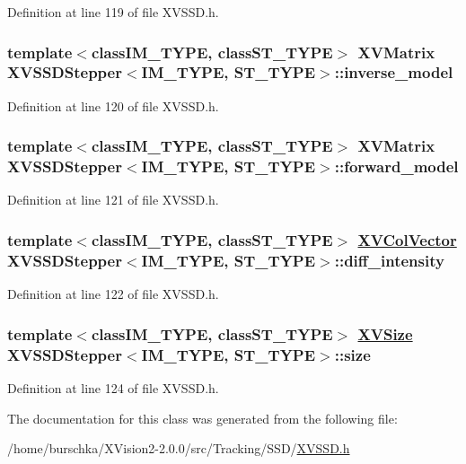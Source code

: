 Definition at line 119 of file XVSSD.h.\label{XVSSDStepper_n5}
\hypertarget{class_XVSSDStepper_n5}{
\subsubsection[inverse_model]{\setlength{\rightskip}{0pt plus 5cm}template$<$classIM\_\-TYPE, classST\_\-TYPE$>$ XVMatrix XVSSDStepper$<$IM\_\-TYPE, ST\_\-TYPE$>$::inverse\_\-model}}




Definition at line 120 of file XVSSD.h.\label{XVSSDStepper_n6}
\hypertarget{class_XVSSDStepper_n6}{
\subsubsection[forward_model]{\setlength{\rightskip}{0pt plus 5cm}template$<$classIM\_\-TYPE, classST\_\-TYPE$>$ XVMatrix XVSSDStepper$<$IM\_\-TYPE, ST\_\-TYPE$>$::forward\_\-model}}




Definition at line 121 of file XVSSD.h.\label{XVSSDStepper_n7}
\hypertarget{class_XVSSDStepper_n7}{
\subsubsection[diff_intensity]{\setlength{\rightskip}{0pt plus 5cm}template$<$classIM\_\-TYPE, classST\_\-TYPE$>$ \hyperlink{class_XVColVector}{XVCol\-Vector} XVSSDStepper$<$IM\_\-TYPE, ST\_\-TYPE$>$::diff\_\-intensity}}




Definition at line 122 of file XVSSD.h.\label{XVSSDStepper_n8}
\hypertarget{class_XVSSDStepper_n8}{
\subsubsection[size]{\setlength{\rightskip}{0pt plus 5cm}template$<$classIM\_\-TYPE, classST\_\-TYPE$>$ \hyperlink{class_XVSize}{XVSize} XVSSDStepper$<$IM\_\-TYPE, ST\_\-TYPE$>$::size}}




Definition at line 124 of file XVSSD.h.

The documentation for this class was generated from the following file:\begin{CompactItemize}
\item 
/home/burschka/XVision2-2.0.0/src/Tracking/SSD/\hyperlink{XVSSD.h-source}{XVSSD.h}\end{CompactItemize}
